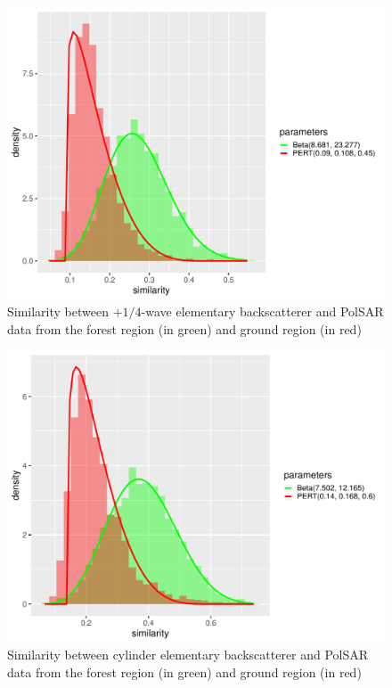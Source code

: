 \documentclass[conference]{IEEEtran}
\begin{document}
\begin{figure}[!ht]
    \vspace{.1\linewidth}
    \centering
    \includegraphics[width = .9\linewidth, height = .7\linewidth]{../../../Figures/paper_19_05/wvp.pdf}
    \caption{Similarity between $+1/4$-wave elementary backscatterer and PolSAR data from the forest region (in green) and ground region (in red)}
    \label{fig:wvp}
\end{figure}

\begin{figure}[!ht]
    \centering
    \includegraphics[width = .9\linewidth, height = .7\linewidth]{../../../Figures/paper_19_05/cy.pdf}
    \caption{Similarity between cylinder elementary backscatterer and PolSAR data from the forest region (in green) and ground region (in red)}
    \label{fig:cy}
\end{figure}
\end{document}
